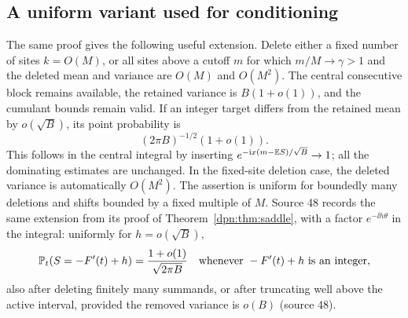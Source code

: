 \documentclass[11pt]{article}
\numberwithin{equation}{section}
\theoremstyle{definition}\newtheorem{definition}[theorem]{Definition}
\theoremstyle{remark}\newtheorem{remark}[theorem]{Remark}
\newcommand{\src}[1]{\textup{(source #1)}}
\begin{document}
\subsection{A uniform variant used for conditioning}\label{dpn:sec:uniform}
The same proof gives the following useful extension. Delete either a fixed
number of sites $k=O(M)$, or all sites above a cutoff $m$ for which
$m/M\to\gamma>1$ and the deleted mean and variance are $O(M)$ and $O(M^2)$.
The central consecutive block remains available, the retained variance is
$B(1+o(1))$, and the cumulant bounds remain valid. If an integer target differs
from the retained mean by $o(\sqrt B)$, its point probability is
\begin{equation}\label{dpn:eq:uniformllt}
 (2\pi B)^{-1/2}(1+o(1)).
\end{equation}
This follows in the central integral by inserting
$e^{-\mathrm i x(m-\mathbb E S)/\sqrt B}\to1$; all the dominating estimates are unchanged.
In the fixed-site deletion case, the deleted variance is automatically
$O(M^2)$. The assertion is uniform for boundedly many deletions and shifts
bounded by a fixed multiple of $M$.  Source 48 records the same extension
from its proof of Theorem~\ref{dpn:thm:saddle}, with a factor
$e^{-\ii h\theta}$ in the integral: uniformly for $h=o(\sqrt B)$,
\begin{equation}\label{dpn:48:eq:shiftedllt}
 \mathbb P_t(S=-F'(t)+h)=\frac{1+o(1)}{\sqrt{2\pi B}}
 \quad\text{whenever }-F'(t)+h\text{ is an integer},
\end{equation}
also after deleting finitely many summands, or after truncating well above
the active interval, provided the removed variance is $o(B)$ \src{48}.
\end{document}
